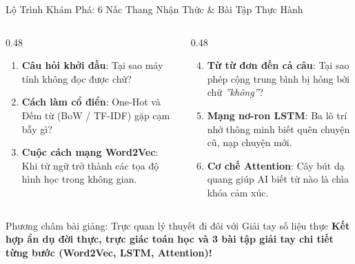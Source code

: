 \documentclass[aspectratio=169, 10pt]{beamer}
\begin{document}
\begin{frame}{Lộ Trình Khám Phá: 6 Nấc Thang Nhận Thức \& Bài Tập Thực Hành}
  \begin{columns}[T, onlytextwidth]
    \begin{column}{0.48\textwidth}
      \begin{enumerate}
        \setlength{\itemsep}{0.7em}
        \item \textbf{\color{HCMUEDarkBlue}Câu hỏi khởi đầu}: Tại sao máy tính không đọc được chữ?
        \item \textbf{\color{HCMUEDarkBlue}Cách làm cổ điển}: One-Hot và Đếm từ (BoW / TF-IDF) gặp cạm bẫy gì?
        \item \textbf{\color{HCMUEDarkBlue}Cuộc cách mạng Word2Vec}: Khi từ ngữ trở thành các tọa độ hình học trong không gian.
      \end{enumerate}
    \end{column}
    \hfill
    \begin{column}{0.48\textwidth}
      \begin{enumerate}
        \setcounter{enumi}{3}
        \setlength{\itemsep}{0.7em}
        \item \textbf{\color{HCMUEDarkBlue}Từ từ đơn đến cả câu}: Tại sao phép cộng trung bình bị hỏng bởi chữ \textit{''không''}?
        \item \textbf{\color{HCMUEDarkBlue}Mạng nơ-ron LSTM}: Ba lô trí nhớ thông minh biết quên chuyện cũ, nạp chuyện mới.
        \item \textbf{\color{HCMUEDarkBlue}Cơ chế Attention}: Cây bút dạ quang giúp AI biết từ nào là chìa khóa cảm xúc.
      \end{enumerate}
    \end{column}
  \end{columns}

  \vspace{0.25cm}
  \begin{alertblock}{Phương châm bài giảng: Trực quan lý thuyết đi đôi với Giải tay số liệu thực}
    \centering\fontsize{7.5}{9.5}\selectfont
    \textbf{Kết hợp ẩn dụ đời thực, trực giác toán học và 3 bài tập giải tay chi tiết từng bước (Word2Vec, LSTM, Attention)!}
  \end{alertblock}
\end{frame}
\end{document}
